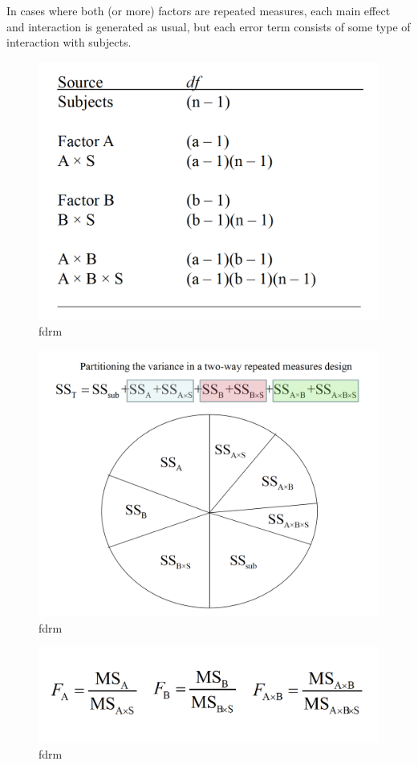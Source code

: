 \documentclass[]{book}
\theoremstyle{definition}
\theoremstyle{definition}
\theoremstyle{definition}
\theoremstyle{remark}
\begin{document}
In cases where both (or more) factors are repeated measures, each main
effect and interaction is generated as usual, but each error term
consists of some type of interaction with subjects.

\begin{figure}
\centering
\includegraphics{img/hicksfdrm1.png}
\caption{fdrm}
\end{figure}

\begin{figure}
\centering
\includegraphics{img/hicksfdrm2.png}
\caption{fdrm}
\end{figure}

\begin{figure}
\centering
\includegraphics{img/hicksfdrm3.png}
\caption{fdrm}
\end{figure}
\end{document}
